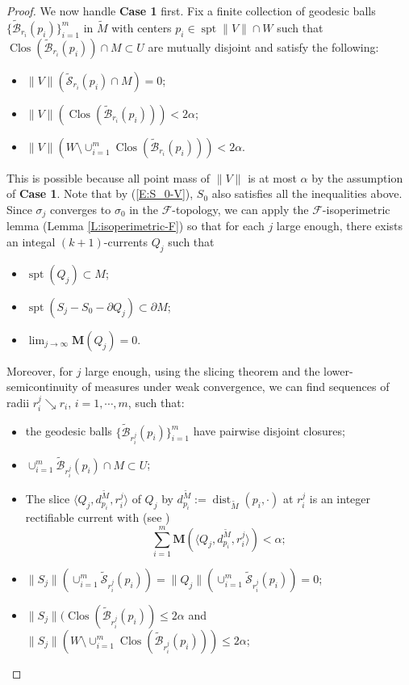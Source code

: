 \documentclass[10pt]{amsart}
\theoremstyle{definition}
\theoremstyle{remark}
\numberwithin{equation}{section}
\newcommand{\al}{\alpha}
\newcommand{\F}{\mathcal{F}}
\newcommand{\lan}{\langle}
\newcommand{\ran}{\rangle}
\newcommand{\si}{\sigma}
\newcommand{\ti}{\tilde}
\newcommand{\M}{\mathbf{M}}
\newcommand{\tM}{\widetilde{M}}
\newcommand{\tBcal}{\widetilde{\mathcal{B}}}
\newcommand{\tScal}{\widetilde{\mathcal{S}}}
\newcommand{\spt}{\operatorname{spt}}
\newcommand{\dist}{\operatorname{dist}}
\newcommand{\Clos}{\operatorname{Clos}}
\begin{document}
\begin{proof}
We now handle {\bf Case 1} first. Fix a finite collection of geodesic balls 
$\{\tBcal_{r_i}(p_i)\}_{i=1}^m$ in $\tM$ with centers $p_i \in \spt \|V\| \cap W$ such that $\Clos(\tBcal_{r_i}(p_i)) \cap M \subset U$ are mutually disjoint and satisfy the following: 
\begin{itemize}
\item $\|V\| (\tScal_{r_i}(p_i) \cap M)=0$;
\item $\|V\| (\Clos(\tBcal_{r_i}(p_i)))  <2\al$;
\item $\|V\| (W \setminus \cup_{i=1}^m \Clos(\tBcal_{r_i}(p_i)) ) <2\al$.
\end{itemize}
This is possible because %
all point mass of $\|V\|$ is at most $\alpha$ by the assumption of \textbf{Case 1}. 
Note that by (\ref{E:S_0-V}), $S_0$ also satisfies all the inequalities above.
Since $\si_j$ converges to $\si_0$ in the $\F$-topology, we can apply the $\F$-isoperimetric lemma (Lemma \ref{L:isoperimetric-F}) so that for each $j$ large enough, there exists an integal $(k+1)$-currents $Q_j$ such that
\begin{itemize}
\item $\spt(Q_j) \subset M$;
\item $\spt(S_j-S_0-\partial Q_j)\subset \partial M$;
\item $\lim_{j\rightarrow\infty}\M(Q_j)=0$.
\end{itemize}
Moreover, for $j$ large enough, using the slicing theorem \cite[\S 28]{Simon} and the lower-semicontinuity of measures under weak convergence, we can find sequences of radii $r^j_i\searrow r_i$, $i=1, \cdots, m$, such that: %
\begin{itemize}
\item the geodesic balls $\{\tBcal_{r_i^j}(p_i)\}_{i=1}^m$ have pairwise disjoint closures;
\item $\cup_{i=1}^m \tBcal_{r_i^j}(p_i) \cap M \subset U$;
\item The slice $\lan Q_j, d^{\tM}_{p_i}, r^j_i\ran$ of $Q_j$ by $d^{\tM}_{p_i}:=\dist_{\ti{M}}(p_i, \cdot)$ at $r^j_i$ is an integer rectifiable current \cite[28.4]{Simon} with (see \cite[28.5(1)]{Simon})
\[ \sum_{i=1}^m \M (\lan Q_j, d^{\tM}_{p_i}, r^j_i\ran) <\al; \]
\item $\|S_j\| ( \cup_{i=1}^m \tScal_{r^j_i}(p_i)) = \|Q_j\| ( \cup_{i=1}^m \tScal_{r^j_i}(p_i)) =0$;
\item $\|S_j\| (\Clos(\tBcal_{r_i^j}(p_i)) \leq 2\al$ and $\|S_j\| (W \setminus \cup_{i=1}^m \Clos(\tBcal_{r_i^j}(p_i))) \leq 2\al$;

\end{itemize}
\end{proof}
\end{document}
